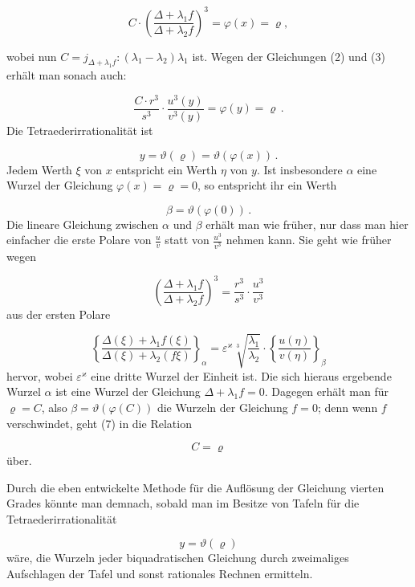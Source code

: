 \documentclass[11pt]{article}
\providecommand{\weberpage}[1]{}
\providecommand{\weq}[2]{\begin{equation}\tag{#1}#2\end{equation}}
\let\Delta\varDelta
\begin{document}
\weq{7}{C\cdot\left(\frac{\Delta+\lambda_1 f}{\Delta+\lambda_2 f}\right)^3 = \varphi(x) = \varrho,}

wobei nun $C = j_{\Delta+\lambda_1 f}:(\lambda_1-\lambda_2)\lambda_1$ ist. Wegen der Gleichungen (2) und (3) erhält man sonach auch:

\[
\frac{C\cdot r^3}{s^3}\cdot\frac{u^3(y)}{v^3(y)} = \varphi(y) = \varrho\,.
\]
Die Tetraederirrationalität ist

\[
y = \vartheta(\varrho) = \vartheta(\varphi(x))\,.
\]
Jedem Werth $\xi$ von $x$ entspricht ein Werth $\eta$ von $y$. Ist insbesondere $\alpha$ eine Wurzel der Gleichung $\varphi(x)=\varrho=0$, so entspricht ihr ein Werth

\[
\beta = \vartheta(\varphi(0))\,.
\]
Die lineare Gleichung zwischen $\alpha$ und $\beta$ erhält man wie früher, nur dass man hier einfacher die erste Polare von $\frac{u}{v}$ statt von $\frac{u^3}{v^3}$ nehmen kann. Sie geht wie früher wegen

\[
\left(\frac{\Delta+\lambda_1 f}{\Delta+\lambda_2 f}\right)^3 = \frac{r^3}{s^3}\cdot\frac{u^3}{v^3}
\]
aus der ersten Polare

\[
\left\{\frac{\Delta(\xi)+\lambda_1 f(\xi)}{\Delta(\xi)+\lambda_2(f\xi)}\right\}_\alpha = \varepsilon^\varkappa\sqrt[3]{\frac{\lambda_1}{\lambda_2}}\cdot\left\{\frac{u(\eta)}{v(\eta)}\right\}_\beta
\]
hervor, wobei $\varepsilon^\varkappa$ eine dritte Wurzel der Einheit ist. Die sich hieraus ergebende Wurzel $\alpha$ ist eine Wurzel der Gleichung $\Delta+\lambda_1 f=0$. Dagegen erhält man für $\varrho=C$, also $\beta=\vartheta(\varphi(C))$ die Wurzeln der Gleichung $f=0$; denn wenn $f$ verschwindet, geht (7) in die Relation

\[
C=\varrho
\]
über.


\weberpage{220}

Durch die eben entwickelte Methode für die Auflösung der Gleichung vierten Grades könnte man demnach, sobald man im Besitze von Tafeln für die Tetraederirrationalität

\[
y = \vartheta(\varrho)
\]
wäre, die Wurzeln jeder biquadratischen Gleichung durch zweimaliges Aufschlagen der Tafel und sonst rationales Rechnen ermitteln.



\weberpage{221}
\end{document}
